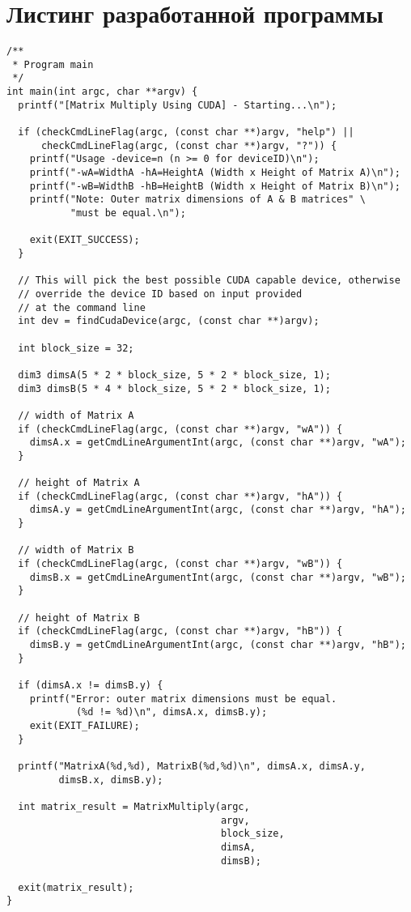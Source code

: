\chapter{Листинг разработанной программы}

\begin{lstlisting}[caption={Пример листинга в приложении}, label={ls:a:01}]
/**
 * Program main
 */
int main(int argc, char **argv) {
  printf("[Matrix Multiply Using CUDA] - Starting...\n");

  if (checkCmdLineFlag(argc, (const char **)argv, "help") ||
      checkCmdLineFlag(argc, (const char **)argv, "?")) {
    printf("Usage -device=n (n >= 0 for deviceID)\n");
    printf("-wA=WidthA -hA=HeightA (Width x Height of Matrix A)\n");
    printf("-wB=WidthB -hB=HeightB (Width x Height of Matrix B)\n");
    printf("Note: Outer matrix dimensions of A & B matrices" \
           "must be equal.\n");

    exit(EXIT_SUCCESS);
  }

  // This will pick the best possible CUDA capable device, otherwise
  // override the device ID based on input provided 
  // at the command line
  int dev = findCudaDevice(argc, (const char **)argv);

  int block_size = 32;

  dim3 dimsA(5 * 2 * block_size, 5 * 2 * block_size, 1);
  dim3 dimsB(5 * 4 * block_size, 5 * 2 * block_size, 1);

  // width of Matrix A
  if (checkCmdLineFlag(argc, (const char **)argv, "wA")) {
    dimsA.x = getCmdLineArgumentInt(argc, (const char **)argv, "wA");
  }

  // height of Matrix A
  if (checkCmdLineFlag(argc, (const char **)argv, "hA")) {
    dimsA.y = getCmdLineArgumentInt(argc, (const char **)argv, "hA");
  }

  // width of Matrix B
  if (checkCmdLineFlag(argc, (const char **)argv, "wB")) {
    dimsB.x = getCmdLineArgumentInt(argc, (const char **)argv, "wB");
  }

  // height of Matrix B
  if (checkCmdLineFlag(argc, (const char **)argv, "hB")) {
    dimsB.y = getCmdLineArgumentInt(argc, (const char **)argv, "hB");
  }

  if (dimsA.x != dimsB.y) {
    printf("Error: outer matrix dimensions must be equal. 
            (%d != %d)\n", dimsA.x, dimsB.y);
    exit(EXIT_FAILURE);
  }

  printf("MatrixA(%d,%d), MatrixB(%d,%d)\n", dimsA.x, dimsA.y,
         dimsB.x, dimsB.y);

  int matrix_result = MatrixMultiply(argc, 
                                     argv, 
                                     block_size, 
                                     dimsA, 
                                     dimsB);

  exit(matrix_result);
}
\end{lstlisting}
